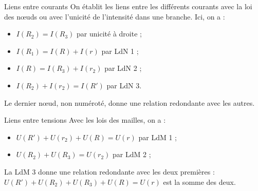 \documentclass[../main/main.tex]{subfiles}
\begin{document}
\begin{tcbraster}[raster columns=2, raster equal height=rows]
    \begin{NCexem}{Liens entre courants}
        On établit les liens entre les différents courants avec la loi des nœuds
        ou avec l'unicité de l'intensité dans une branche. Ici, on a :
        \begin{itemize}
            \item $I(R_2) = I(R_3)$ par unicité à droite ;
            \item $I(R_1) = I(R) + I(r)$ par LdN 1 ;
            \item $I(R) = I(R_3) + I(r_2)$ par LdN 2 ;
            \item $I(R_2) + I(r_2) = I(R')$ par LdN 3.
        \end{itemize}
        Le dernier nœud, non numéroté, donne une relation redondante avec les
        autres.
    \end{NCexem}
    \begin{NCcexe}{Liens entre tensions}
        Avec les lois des mailles, on a :
        \begin{itemize}
            \item $U(R') + U(r_2) + U(R) = U(r)$ par LdM 1 ;
            \item $U(R_2) + U(R_3) = U(r_2)$ par LdM 2 ;
        \end{itemize}
        La LdM 3 donne une relation redondante avec les deux premières : $U(R')
        + U(R_2) + U(R_3) + U(R) = U(r)$ est la somme des deux.
    \end{NCcexe}
\end{tcbraster}

\newpage
\end{document}
